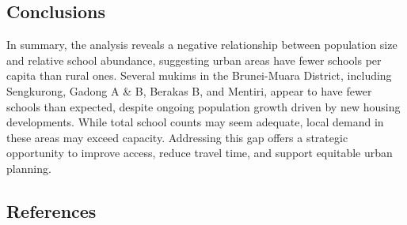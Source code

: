 \documentclass[
  12pt,
]{article}
\begin{document}
\subsection{Conclusions}\label{sec-conc}

In summary, the analysis reveals a negative relationship between
population size and relative school abundance, suggesting urban areas
have fewer schools per capita than rural ones. Several mukims in the
Brunei-Muara District, including Sengkurong, Gadong A \& B, Berakas B,
and Mentiri, appear to have fewer schools than expected, despite ongoing
population growth driven by new housing developments. While total school
counts may seem adequate, local demand in these areas may exceed
capacity. Addressing this gap offers a strategic opportunity to improve
access, reduce travel time, and support equitable urban planning.

\subsection*{References}\label{references}

\label{refs}
\end{document}
